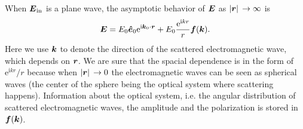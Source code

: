 \documentclass[hyperref, a4paper]{article}
\newcommand*{\ii}{\mathrm{i}}
\newcommand*{\ee}{\mathrm{e}}
\begin{document}
When $\vb*{E}_\text{in}$ is a plane wave, the asymptotic behavior of $\vb*{E}$ as $\abs*{\vb*{r}} \to \infty$ is 
\begin{equation}
    \vb*{E} = E_0 \vu*{e}_0 \ee^{\ii \vb*{k}_0 \cdot \vb*{r}} + E_0 \frac{\ee^{\ii k r}}{r} \vb*{f}(\vb*{k}).
\end{equation}
Here we use $\vb*{k}$ to denote the direction of the scattered electromagnetic wave, which depends on $\vb*{r}$.
We are sure that the spacial dependence is in the form of $\ee^{\ii k r} / r$ because when $\abs*{\vb*{r}} \to 0$
the electromagnetic waves can be seen as spherical waves (the center of the sphere being the optical system where 
scattering happens). Information about the optical system, i.e. the angular distribution of scattered 
electromagnetic waves, the amplitude and the polarization is stored in $\vb*{f}(\vb*{k})$.
\end{document}
